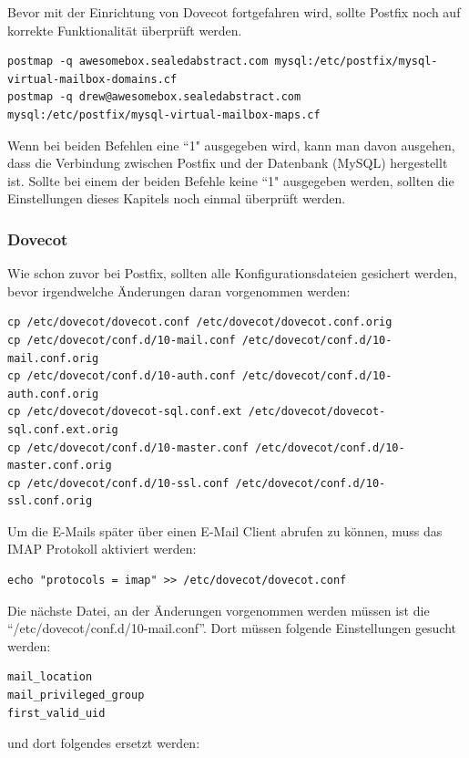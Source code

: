 Bevor mit der Einrichtung von Dovecot fortgefahren wird, sollte Postfix noch auf korrekte Funktionalität überprüft werden. 

\begin{lstlisting}
postmap -q awesomebox.sealedabstract.com mysql:/etc/postfix/mysql-virtual-mailbox-domains.cf
postmap -q drew@awesomebox.sealedabstract.com mysql:/etc/postfix/mysql-virtual-mailbox-maps.cf
\end{lstlisting}

Wenn bei beiden Befehlen eine ``1" ausgegeben wird, kann man davon ausgehen, dass die Verbindung zwischen Postfix und der Datenbank (MySQL) hergestellt ist.
Sollte bei einem der beiden Befehle keine ``1" ausgegeben werden, sollten die Einstellungen dieses Kapitels noch einmal überprüft werden.

\subsubsection{Dovecot}
Wie schon zuvor bei Postfix, sollten alle Konfigurationsdateien gesichert werden, bevor irgendwelche Änderungen daran vorgenommen werden:

\begin{lstlisting}
cp /etc/dovecot/dovecot.conf /etc/dovecot/dovecot.conf.orig
cp /etc/dovecot/conf.d/10-mail.conf /etc/dovecot/conf.d/10-mail.conf.orig
cp /etc/dovecot/conf.d/10-auth.conf /etc/dovecot/conf.d/10-auth.conf.orig
cp /etc/dovecot/dovecot-sql.conf.ext /etc/dovecot/dovecot-sql.conf.ext.orig
cp /etc/dovecot/conf.d/10-master.conf /etc/dovecot/conf.d/10-master.conf.orig
cp /etc/dovecot/conf.d/10-ssl.conf /etc/dovecot/conf.d/10-ssl.conf.orig
\end{lstlisting}

Um die E-Mails später über einen E-Mail Client abrufen zu können, muss das IMAP Protokoll aktiviert werden:

\begin{lstlisting}
echo "protocols = imap" >> /etc/dovecot/dovecot.conf
\end{lstlisting}

Die nächste Datei, an der Änderungen vorgenommen werden müssen ist die ``/etc/dovecot/conf.d/10-mail.conf''.
Dort müssen folgende Einstellungen gesucht werden:

\begin{lstlisting}
mail_location
mail_privileged_group
first_valid_uid
\end{lstlisting}

und dort folgendes ersetzt werden:

